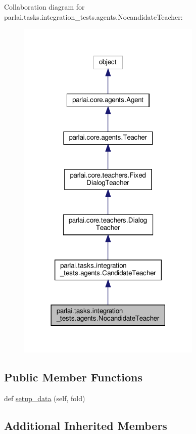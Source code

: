 Collaboration diagram for parlai.\+tasks.\+integration\+\_\+tests.\+agents.\+Nocandidate\+Teacher\+:
\nopagebreak
\begin{figure}[H]
\begin{center}
\leavevmode
\includegraphics[width=249pt]{classparlai_1_1tasks_1_1integration__tests_1_1agents_1_1NocandidateTeacher__coll__graph}
\end{center}
\end{figure}
\subsection*{Public Member Functions}
\begin{DoxyCompactItemize}
\item 
def \hyperlink{classparlai_1_1tasks_1_1integration__tests_1_1agents_1_1NocandidateTeacher_a0cf2accf985db966f44f77a7328fcff2}{setup\+\_\+data} (self, fold)
\end{DoxyCompactItemize}
\subsection*{Additional Inherited Members}


